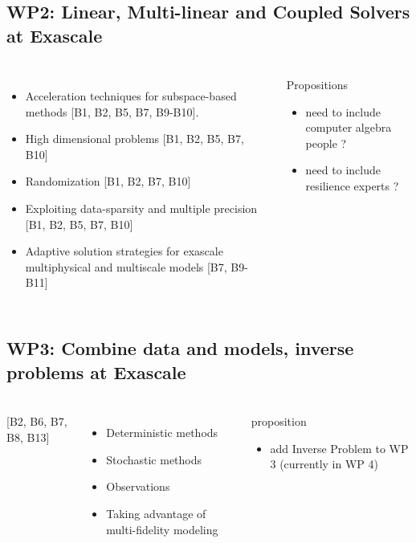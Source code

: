 \subsection{WP2: Linear, Multi-linear and Coupled Solvers at Exascale}
\begin{frame}
  \frametitle{\insertsectionhead}
  \framesubtitle{\insertsubsectionhead}
  \begin{columns}
    \begin{itemize}
      \item Acceleration techniques for subspace-based methods [B1, B2, B5, B7, B9-B10].
      \item High dimensional problems [B1, B2, B5, B7, B10] 
      \item Randomization [B1, B2, B7, B10]
      \item Exploiting data-sparsity and multiple precision [B1, B2, B5, B7, B10]
      \item Adaptive solution strategies for exascale multiphysical and multiscale models [B7, B9-B11] 
    \end{itemize}

    \begin{alertblock}{Propositions}
    \begin{itemize}
      \item need to include computer algebra people ?
      \item need to include resilience experts ?
      \end{itemize}
  \end{alertblock}
  \end{columns}

\end{frame}

\subsection{WP3: Combine data and models, inverse problems at Exascale }
\begin{frame}
  \frametitle{\insertsectionhead}
  \framesubtitle{\insertsubsectionhead}
  \begin{columns}
    [B2, B6, B7, B8, B13]
    \begin{itemize}
      \item Deterministic methods
      \item Stochastic methods
      \item Observations
      \item Taking advantage of multi-fidelity modeling
    \end{itemize}
    \begin{alertblock}{proposition}
      \begin{itemize}
        \item add Inverse Problem to WP 3 (currently in WP 4)
      \end{itemize}
    \end{alertblock}
  \end{columns}
\end{frame}

